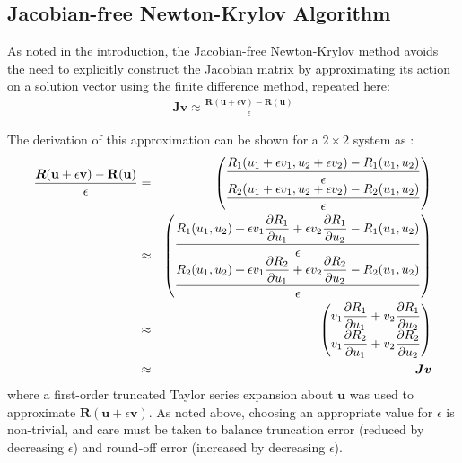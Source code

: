 \documentclass[sn-mathphys,Numbered]{sn-jnl}%
\newcommand{\bb}{\boldsymbol}
\begin{document}
\subsection{Jacobian-free Newton-Krylov Algorithm}
\label{sec:JFNK_alg}

As noted in the introduction, the Jacobian-free Newton-Krylov method avoids the need to explicitly construct the Jacobian matrix by approximating its action on a solution vector using the finite difference method, repeated here:
\begin{eqnarray} \label{eq:JF}
	\bb{J} \bb{v} \approx \frac{\bb{R}(\bb{u} + \epsilon \bb{v}) - \bb{R}(\bb{u})}{\epsilon}
\end{eqnarray}

The derivation of this approximation can be shown for a $2 \times 2$ system as \cite{Knoll2004}:
\begin{eqnarray}
	\frac{\bb{R}(\mathbf{u} + \epsilon \mathbf{v}) - \mathbf{R}(\mathbf{u})}{\epsilon}
	&=&
	\begin{pmatrix}
	\dfrac{R_1 (u_1 + \epsilon v_1, u_2 + \epsilon v_2) - R_1 (u_1, u_2)}{\epsilon}\\
	\dfrac{R_2 (u_1 + \epsilon v_1, u_2 + \epsilon v_2) - R_2 (u_1, u_2)}{\epsilon}
	\end{pmatrix} \notag \\
	&\approx&
	\begin{pmatrix}
	\dfrac{R_1 (u_1,u_2) + \epsilon v_1 \dfrac{\partial R_1}{\partial u_1} + \epsilon v_2 \dfrac{\partial R_1}{\partial u_2} - R_1 (u_1, u_2)}{\epsilon}\\
	\dfrac{R_2 (u_1, u_2) + \epsilon v_1 \dfrac{\partial R_2}{\partial u_1} + \epsilon v_2 \dfrac{\partial R_2}{\partial u_2}  - R_2 (u_1, u_2)}{\epsilon}
	\end{pmatrix} \notag \\
	&\approx&
	\begin{pmatrix}
	v_1 \dfrac{\partial R_1}{\partial u_1} +  v_2 \dfrac{\partial R_1}{\partial u_2} \\
	v_1 \dfrac{\partial R_2}{\partial u_1} + v_2 \dfrac{\partial R_2}{\partial u_2}
	\end{pmatrix} \notag \\
	&\approx&
	\bb{J} \bb{v}
\end{eqnarray}
where a first-order truncated Taylor series expansion about $\bb{u}$ was used to approximate $\bb{R} (\bb{u} + \epsilon \bb{v})$.
As noted above, choosing an appropriate value for $\epsilon$ is non-trivial, and care must be taken to balance truncation error (reduced by decreasing $\epsilon$) and round-off error (increased by decreasing $\epsilon$).
\end{document}

